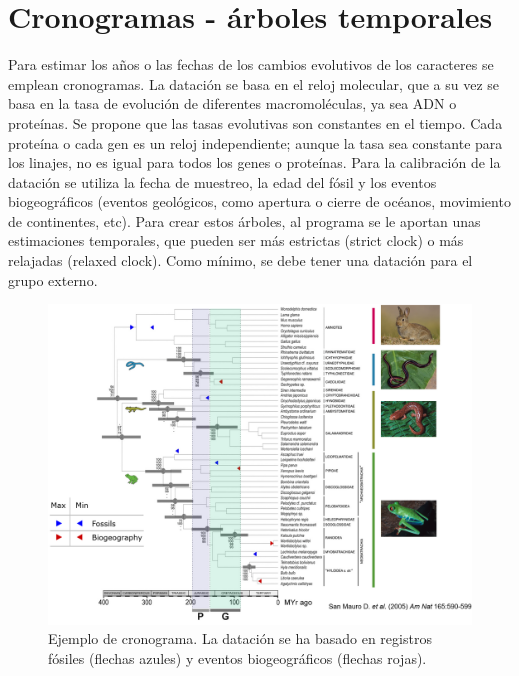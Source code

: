 \chapter{Cronogramas - árboles temporales}
Para estimar los años o las fechas de los cambios evolutivos de los caracteres se emplean cronogramas. La datación se basa en el reloj molecular, que a su vez se basa en la tasa de evolución de diferentes macromoléculas, ya sea ADN o proteínas. Se propone que las tasas evolutivas son constantes en el tiempo. Cada proteína o cada gen es un reloj independiente; aunque la tasa sea constante para los linajes, no es igual para todos los genes o proteínas. Para la calibración de la datación se utiliza la fecha de muestreo, la edad del fósil y los eventos biogeográficos (eventos geológicos, como apertura o cierre de océanos, movimiento de continentes, etc). Para crear estos árboles, al programa se le aportan unas estimaciones temporales, que pueden ser más estrictas (strict clock) o más relajadas (relaxed clock). Como mínimo, se debe tener una datación para el grupo externo. 

\begin{figure}[htbp]
\centering
\includegraphics[width=0.9\linewidth]{figs/cronograma-ejemplo.png}
\caption{Ejemplo de cronograma. La datación se ha basado en registros fósiles (flechas azules) y eventos biogeográficos (flechas rojas).}
\end{figure}